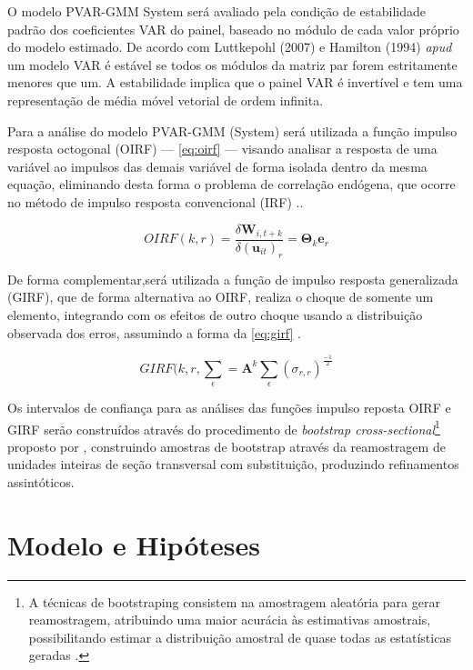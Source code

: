 \documentclass[
  12pt,
  12pt,
  openright,
  oneside,
  a4paper,
  chapter=TITLE,
  section=TITLE,
  subsection=TITLE,
  subsubsection=TITLE,
  english,
  portugues,
  sumario=tradicional]{abntex2}
\begin{document}
O modelo PVAR-GMM System será avaliado pela condição de estabilidade padrão dos coeficientes VAR do painel, baseado no módulo de cada valor próprio do modelo estimado. De acordo com Luttkepohl (2007) e Hamilton (1994) \emph{apud} \textcite{sigmund:2008} um modelo VAR é estável se todos os módulos da matriz par forem estritamente menores que um. A estabilidade implica que o painel VAR é invertível e tem uma representação de média móvel vetorial de ordem infinita.

Para a análise do modelo PVAR-GMM (System) será utilizada a função impulso resposta octogonal (OIRF) --- \autoref{eq:oirf} --- visando analisar a resposta de uma variável ao impulsos das demais variável de forma isolada dentro da mesma equação, eliminando desta forma o problema de correlação endógena, que ocorre no método de impulso resposta convencional (IRF) \cite{sigmund:2008}..

\begin{equation}\label{eq:oirf}
OIRF(k,r) = \frac{\delta\mathbf{W}_{i,t+k}}{\delta(\mathbf{u}_{it})_{r}} = \mathbf{\Theta}_{k}\mathbf{e}_{r}  
\end{equation}

De forma complementar,será utilizada a função de impulso resposta generalizada (GIRF), que de forma alternativa ao OIRF, realiza o choque de somente um elemento, integrando com os efeitos de outro choque usando a distribuição observada dos erros, assumindo a forma da \autoref{eq:girf} \cite{sigmund:2008}.

\begin{equation}\label{eq:girf}
GIRF(k,r,\sum_{\epsilon} = \mathbf{A}^k\sum_{\epsilon}(\sigma_{r,r})^\frac{-1}{2} 
\end{equation}

Os intervalos de confiança para as análises das funções impulso reposta OIRF e GIRF serão construídos através do procedimento de \emph{bootstrap cross-sectional}\footnote{A técnicas de bootstraping consistem na amostragem aleatória para gerar reamostragem, atribuindo uma maior acurácia às estimativas amostrais, possibilitando estimar a distribuição amostral de quase todas as estatísticas geradas \cite{sigmund:2008}.} proposto por \textcite{kapetanios:2008}, construindo amostras de bootstrap através da reamostragem de unidades inteiras de seção transversal com substituição, produzindo refinamentos assintóticos.

\section{Modelo e Hipóteses}
\end{document}
